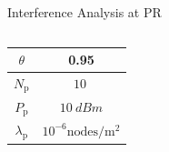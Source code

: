 \documentclass[12pt]{beamer}
\newcommand{\fs}[1]{\fontsize{ #1 pt}{8.2}\selectfont}
\newcommand{\sub}[1]{_{\text{#1}}}
\begin{document}
\begin{frame}[t]{Interference Analysis at PR}
\begin{columns}
\begin{column}{0.45\paperwidth}
{\begin{overlayarea}{\textwidth}{5.1cm}
\begin{figure}[t]
	\end{figure}
	\end{overlayarea}
	\vspace{-0.2cm}
	\begin{overlayarea}{\textwidth}{2.2cm}
	\fs{8}
	\begin{table}[t]
        	\renewcommand{\arraystretch}{1.3}
        \centering
        \begin{tabular}{c|c}
        \hline
        	$\theta$  & 0.95 \\ \hline
		$N\sub{p}$ & $\SI{10}{}$ \\ \hline
		$P\sub{p}$ & $\SI{10}{dBm}$ \\ \hline
		$\lambda\sub{p}$ & $10^{-6}\text{nodes}/{\text{m}^2}$  \\ 	
\hline
        \end{tabular}
    \end{table}
    \end{overlayarea}

}
	\end{column}
\end{columns}
{
}
{
}
\end{frame}
\end{document}
